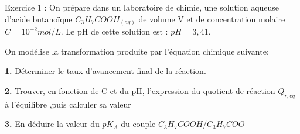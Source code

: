 \documentclass[12pt, french]{article}
\begin{document}
\begin{center}

\end{center}

\vspace{-0.2cm}
   \begin{Box2}{Exercice 1 :  }
On prépare dans un laboratoire de chimie, une solution
aqueuse d’acide butanoïque $C_3H_7COOH_{(aq)}$ de volume V et de concentration molaire $C = 10^{-2}mol/L$. Le pH de cette solution est : $pH=3,41$.

On modélise la transformation produite par l’équation
chimique suivante: 


\textbf{1. }Déterminer le taux d’avancement final de la réaction.

\textbf{2. }Trouver, en fonction de C et du pH, l’expression du quotient de réaction $Q_{r,eq}$  à l’équilibre ,puis calculer sa valeur

\textbf{3. }En déduire la valeur du $pK_A$ du couple $C_3H_7COOH/C_3H_7COO^-$


   \end{Box2}
\end{document}
